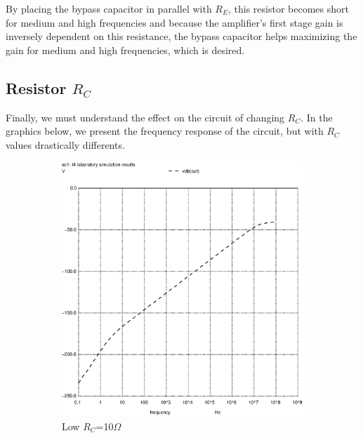 By placing the bypass capacitor in parallel with $R_E$, this resistor becomes short for medium and high frequencies and because the amplifier's first stage gain is inversely dependent on this resistance, the bypass capacitor helps maximizing the gain for medium and high frequencies, which is desired.


\subsection{Resistor $R_C$}
Finally, we must understand the effect on the circuit of changing $R_C$. In the graphics below, we present the frequency response of the circuit, but with $R_C$ values drastically differents.


\begin{figure}[h]
\centering
\begin{subfigure}{.5\textwidth}
    \centering
    \includegraphics[scale=0.33]{images/rcsmall.ps}
    \caption{Low $R_C$=10$\Omega$}
\end{subfigure}%
\begin{subfigure}{.5\textwidth}
    \centering

\end{subfigure}
\end{figure}
